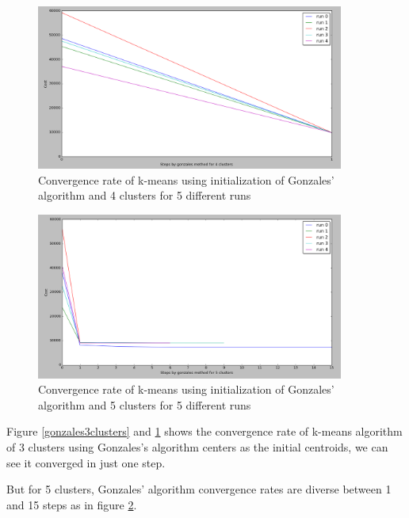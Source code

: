 \begin{figure}[!htb]
\centering
\includegraphics[width=0.9\textwidth]{shots/gonzales4clusters.png}
\caption{Convergence rate of k-means using initialization of Gonzales' algorithm and 4 clusters for 5 different runs  }
\label{gonzales4clusters}
\end{figure}

\begin{figure}[!htb]
\centering
\includegraphics[width=0.9\textwidth]{shots/gonzales5clusters.png}
\caption{ Convergence rate of k-means using initialization of Gonzales' algorithm and 5 clusters for 5 different runs }
\label{gonzales5clusters}
\end{figure}

Figure \ref{gonzales3clusters} and \ref{gonzales4clusters} shows the convergence rate of k-means algorithm of 3 clusters using Gonzales's algorithm centers as the initial centroids, we can see it converged in just one step.

But for 5 clusters, Gonzales' algorithm convergence rates are diverse between 1 and 15 steps as in figure \ref{gonzales5clusters}.

